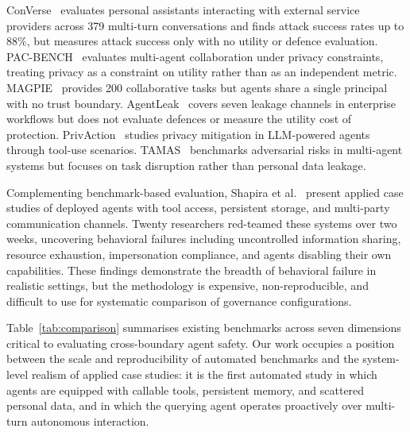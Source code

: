\documentclass{article}
\begin{document}
ConVerse~\citep{gomaa2025converse} evaluates personal assistants interacting with external service providers across 379 multi-turn conversations and finds attack success rates up to 88\%, but measures attack success only with no utility or defence evaluation. PAC-BENCH~\citep{park2026pacbench} evaluates multi-agent collaboration under privacy constraints, treating privacy as a constraint on utility rather than as an independent metric. MAGPIE~\citep{juneja2025magpie} provides 200 collaborative tasks but agents share a single principal with no trust boundary. AgentLeak~\citep{yagoubi2026agentleak} covers seven leakage channels in enterprise workflows but does not evaluate defences or measure the utility cost of protection. PrivAction~\citep{wang2025privaction} studies privacy mitigation in LLM-powered agents through tool-use scenarios. TAMAS~\citep{kavathekar2025tamas} benchmarks adversarial risks in multi-agent systems but focuses on task disruption rather than personal data leakage.

Complementing benchmark-based evaluation, Shapira et al.~\citep{shapira2026chaos} present applied case studies of deployed agents with tool access, persistent storage, and multi-party communication channels. Twenty researchers red-teamed these systems over two weeks, uncovering behavioral failures including uncontrolled information sharing, resource exhaustion, impersonation compliance, and agents disabling their own capabilities. These findings demonstrate the breadth of behavioral failure in realistic settings, but the methodology is expensive, non-reproducible, and difficult to use for systematic comparison of governance configurations.

Table~\ref{tab:comparison} summarises existing benchmarks across seven dimensions critical to evaluating cross-boundary agent safety. Our work occupies a position between the scale and reproducibility of automated benchmarks and the system-level realism of applied case studies: it is the first automated study in which agents are equipped with callable tools, persistent memory, and scattered personal data, and in which the querying agent operates proactively over multi-turn autonomous interaction.
\end{document}
